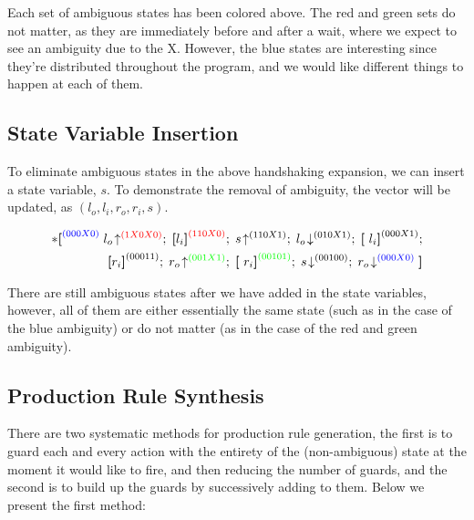 \documentclass[times,10pt]{article}
\begin{document}
Each set of ambiguous states has been colored above.  The red and green sets do not matter, as they are immediately before and after a wait, where we expect to see an ambiguity due to the X.  However, the blue states are interesting since they're distributed throughout the program, and we would like different things to happen at each of them. 


\subsection{State Variable Insertion}

To eliminate ambiguous states in the above handshaking expansion, we can insert a state variable, $s$.  To demonstrate the removal of ambiguity, the vector will be updated, as $(l_o, l_i, r_o, r_i, s)$.


\begin{align*} 
*\textbf{[} ^{\color{blue}(000X0)} \;  l_o \! \uparrow^{\color{red}(1X0X0)}; \; \textbf{[}l_i\textbf{]}^{\color{red}(110X0)}; \; s\!\uparrow^{(110X1)}; \; l_o\!\downarrow^{(010X1)}; \; \textbf{[}~l_i\textbf{]}^{(000X1)}; \\
\textbf{[}r_i\textbf{]}^{(00011)}; \; r_o \! \uparrow^{\color{green}(001X1)}; \; \textbf{[}~r_i\textbf{]}^{\color{green}(00101)}; \; s\!\downarrow^{(00100)}; \; r_o \! \downarrow^{\color{blue}(000X0)}\textbf{]}
\end{align*}

There are still ambiguous states after we have added in the state variables, however, all of them are either essentially the same state (such as in the case of the blue ambiguity) or do not matter (as in the case of the red and green ambiguity).

\subsection{Production Rule Synthesis}

There are two systematic methods for production rule generation, the first is to guard each and every action with the entirety of the (non-ambiguous) state at the moment it would like to fire, and then reducing the number of guards, and the second is to build up the guards by successively adding to them.  Below we present the first method:
\end{document}
